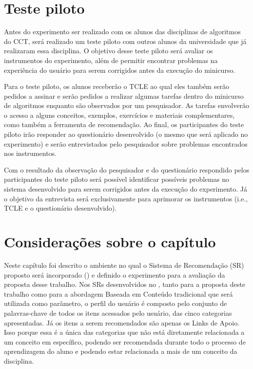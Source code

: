 \section{Teste piloto}

Antes do experimento ser realizado com os alunos das disciplinas de algoritmos do CCT, será realizado um teste piloto com
outros alunos da universidade que já realizaram essa disciplina. O objetivo desse teste piloto será avaliar os
instrumentos do experimento, além de permitir encontrar problemas na experiência do  usuário para serem corrigidos
antes da execução do minicurso.

Para o teste piloto, os alunos receberão o TCLE ao qual eles também serão pedidos a assinar e serão pedidos a realizar algumas
tarefas dentro do minicurso de algoritmos enquanto são observados por um pesquisador. As tarefas envolverão o acesso a
alguns conceitos, exemplos, exercícios e materiais complementares, como também a ferramenta de recomendação. Ao final, os
participantes do teste piloto irão responder ao questionário desenvolvido (o mesmo que será aplicado no experimento) e
serão entrevistados pelo pesquisador sobre problemas encontrados nos instrumentos.

Com o resultado da observação do pesquisador e do questionário respondido pelos participantes do teste piloto será possível
identificar possíveis problemas no sistema desenvolvido para serem corrigidos antes da execução do experimento. Já o objetivo da
entrevista será exclusivamente para aprimorar os instrumentos (i.e., TCLE e o questionário desenvolvido).

\section{Considerações sobre o capítulo}

Neste capítulo foi descrito o ambiente no qual o Sistema de Recomendação (SR) proposto será incorporado (\adaptweb) e definido o
experimento para a avaliação da proposta desse trabalho. Nos SRs desenvolvidos no \adaptweb, tanto para a proposta deste trabalho como para a abordagem
Baseada em Conteúdo tradicional que será utilizada como parâmetro, o perfil do usuário é composto pelo conjunto de palavras-chave de todos os itens acessados pelo usuário, das
cinco categorias apresentadas. Já os itens a serem recomendados são apenas os Links de Apoio. Isso porque essa é a única das categorias
que não está diretamente relacionada a um conceito em específico, podendo ser recomendada durante todo o processo de
aprendizagem do aluno e podendo estar relacionada a mais de um conceito da disciplina.

